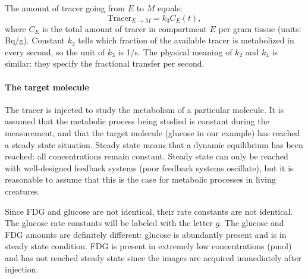 \documentclass[11pt,oneside]{article}
\begin{document}
The amount of tracer going from $E$ to $M$ equals:
\begin{equation}
  \mbox{Tracer}_{E \rightarrow M} = k_3 C_E(t),
\end{equation}
where $C_E$ is the total amount of tracer in compartment $E$ per gram tissue
(units: Bq/g). Constant $k_3$ tells which fraction of the available tracer is
metabolized in every second, so the unit of $k_3$ is 1/s. The physical meaning
of $k_2$ and $k_4$ is similar: they specify the fractional transfer per
second.

\paragraph{The target molecule}
The tracer is injected to study the metabolism of a particular molecule. It is
assumed that the metabolic process being studied is constant during the
measurement, and that the target molecule (glucose in our example) has reached
a steady state situation. Steady state means that a dynamic equilibrium has
been reached: all concentrations remain constant. Steady state can only be
reached with well-designed feedback systems (poor feedback systems oscillate),
but it is reasonable to assume that this is the case for metabolic processes
in living creatures.

Since FDG and glucose are not identical, their rate constants are not
identical.  The glucose rate constants will be labeled with the letter
$g$. The glucose and FDG amounts are definitely different: glucose is
abundantly present and is in steady state condition. FDG is present in
extremely low concentrations (pmol) and has not reached steady state since the
images are acquired immediately after injection.
\end{document}
